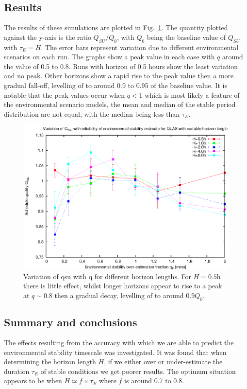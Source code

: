 \subsection{Results}
The results of these simulations are plotted in Fig.~\ref{fig:reliable}. The quantity plotted against the y-axis is the ratio $Q_{SU}/Q_0$, with $Q_0$ being the baseline value of $Q_{SU}$ with $\tau_E=H$. The error bars represent variation due to different environmental scenarios on each run. The graphs show a peak value in each case with $q$ around the value of 0.5 to 0.8. Runs with horizon of 0.5 hours show the least variation and no peak. Other horizons show a rapid rise to the peak value then a more gradual fall-off, levelling of to around 0.9 to 0.95 of the baseline value. It is notable that the peak values occur when $q < 1$ which is most likely a feature of the environmental scenario models, the mean and median of the stable period distribution are not equal, with the median being less than $\tau_E$.

\begin{figure}[htp]
\begin{center}
  \includegraphics[scale=1.0, angle=0]{figures/horiz_reliability.eps}
  \caption[Variation of qsu with q for different horizon lengths.]
  {Variation of qsu with q for different horizon lengths. For $H=0.5$h there is little effect, whilst longer horizons appear to rise to a peak at $q \sim 0.8$ then a gradual decay, levelling of to around $0.9Q_0$.}
\label{fig:reliable}
\end{center}
\end{figure}

\subsection{Summary and conclusions}
The effects resulting from the accuracy with which we are able to predict the environmental stability timescale was investigated. It was found that when determining the horizon length $H$, if we either over or under-estimate the duration $\tau_E$ of stable conditions we get poorer results. The optimum situation appears to be when $H \simeq f \times \tau_E$ where $f$ is around 0.7 to 0.8.
